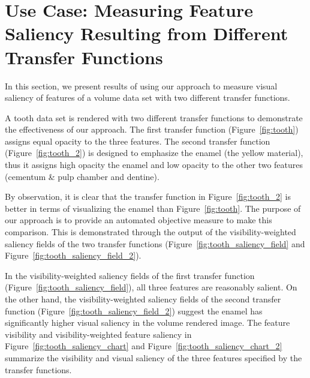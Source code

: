 \section{Use Case: Measuring Feature Saliency Resulting from Different Transfer Functions}
In this section, we present results of using our approach to measure visual saliency of features of a volume data set with two different transfer functions.

A tooth data set \cite{website:Roettger_volume_2013} is rendered with two different transfer functions to demonstrate the effectiveness of our approach. The first transfer function (Figure~\ref{fig:tooth}) assigns equal opacity to the three features.
The second transfer function (Figure~\ref{fig:tooth_2}) is designed to emphasize the enamel (the yellow material), thus it assigns high opacity the enamel and low opacity to the other two features (cementum \& pulp chamber and dentine).

By observation, it is clear that the transfer function in Figure~\ref{fig:tooth_2} is better in terms of visualizing the enamel than Figure~\ref{fig:tooth}. The purpose of our approach is to provide an automated objective measure to make this comparison. This is demonstrated through the output of the visibility-weighted saliency fields of the two transfer functions (Figure~\ref{fig:tooth_saliency_field} and Figure~\ref{fig:tooth_saliency_field_2}).

In the visibility-weighted saliency fields of the first transfer function (Figure~\ref{fig:tooth_saliency_field}), all three features are reasonably salient.
On the other hand, the visibility-weighted saliency fields of the second transfer function (Figure~\ref{fig:tooth_saliency_field_2}) suggest the enamel has significantly higher visual saliency in the volume rendered image.
The feature visibility and visibility-weighted feature saliency in Figure~\ref{fig:tooth_saliency_chart} and Figure~\ref{fig:tooth_saliency_chart_2} summarize the visibility and visual saliency of the three features specified by the transfer functions.

